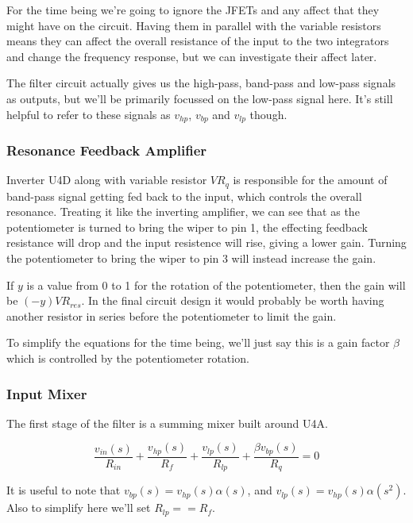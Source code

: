 \documentclass{article}
\begin{document}
For the time being we're going to ignore the JFETs and any affect that they might have on the circuit. Having them in parallel with the variable resistors means they can affect the overall resistance of the input to the two integrators and change the frequency response, but we can investigate their affect later.

The filter circuit actually gives us the high-pass, band-pass and low-pass signals as outputs, but we'll be primarily focussed on the low-pass signal here. It's still helpful to refer to these signals as $v_{hp}$, $v_{bp}$ and $v_{lp}$ though.

\subsubsection{Resonance Feedback Amplifier}

Inverter U4D along with variable resistor $VR_q$ is responsible for the amount of band-pass signal getting fed back to the input, which controls the overall resonance. Treating it like the inverting amplifier, we can see that as the potentiometer is turned to bring the wiper to pin 1, the effecting feedback resistance will drop and the input resistence will rise, giving a lower gain. Turning the potentiometer to bring the wiper to pin 3 will instead increase the gain.

If $y$ is a value from 0 to 1 for the rotation of the potentiometer, then the gain will be $(-y)VR_{res}$. In the final circuit design it would probably be worth having another resistor in series before the potentiometer to limit the gain.

To simplify the equations for the time being, we'll just say this is a gain factor $\beta$ which is controlled by the potentiometer rotation.

\subsubsection{Input Mixer}

The first stage of the filter is a summing mixer built around U4A.


\begin{equation}
  \frac{v_{in}(s)}{R_{in}} + \frac{v_{hp}(s)}{R_f} + \frac{v_{lp}(s)}{R_{lp}}  + \frac{{\beta}v_{bp}(s)}{R_q} = 0
\end{equation}

It is useful to note that $v_{bp}(s) = v_{hp}(s)\alpha(s)$, and $v_{lp}(s) = v_{hp}(s)\alpha(s^2)$. Also to simplify here we'll set $R_{lp} == R_f$.
\end{document}

